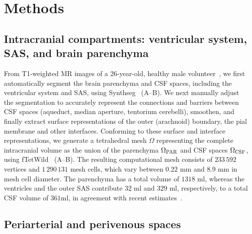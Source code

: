 \documentclass[fleqn,10pt]{wlscirep}
\begin{document}
\section*{Methods}

\subsection*{Intracranial compartments: ventricular system, SAS, and brain parenchyma}

From T1-weighted MR images of a 26-year-old, healthy male volunteer~\cite{hodneland2019new},
we first automatically segment the brain parenchyma and CSF spaces,
including the ventricular system and SAS, using
Synthseg~\cite{billot2023robust,billot2023synthseg}
(A--B). We next manually adjust the segmentation to
accurately represent the connections and barriers between CSF spaces (aqueduct,
median aperture, tentorium cerebelli), smoothen, and finally extract
surface representations of the outer (arachnoid) boundary, the pial
membrane and other interfaces. Conforming to these surface and
interface representations, we generate a tetrahedral mesh $\Omega$
representing the complete intracranial volume as the union of the
parenchyma $\Omega_{\rm PAR}$ and CSF spaces $\Omega_{\rm CSF}$, using
fTetWild~\cite{hu2020fast} (A--B). The resulting
computational mesh consists of $233\,592$ vertices and $1\,290\,131$
mesh cells, which vary between $0.22$ mm and $8.9$ mm in mesh cell
diameter. The parenchyma has a total volume of $1318$ ml, whereas the
ventricles and the outer SAS contribute $32$ ml and $329$ ml,
respectively, to a total CSF volume of $361$ml, in agreement with
recent estimates~\cite{hladky2024regulation}.

\subsection*{Periarterial and perivenous spaces}
\end{document}
